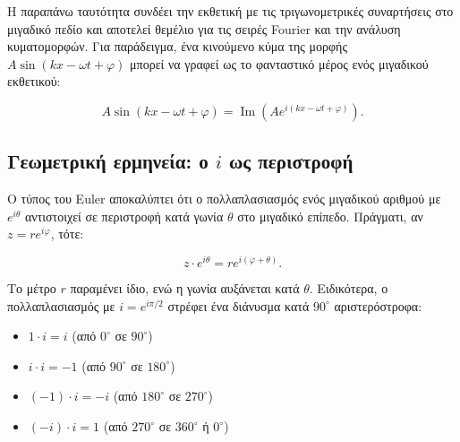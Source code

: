 Η παραπάνω ταυτότητα συνδέει την εκθετική με τις τριγωνομετρικές
συναρτήσεις στο μιγαδικό πεδίο και αποτελεί θεμέλιο για τις σειρές
Fourier και την ανάλυση κυματομορφών. Για παράδειγμα, ένα κινούμενο κύμα
της μορφής \(A\sin(kx - \omega t + \varphi)\) μπορεί να γραφεί ως το
φανταστικό μέρος ενός μιγαδικού εκθετικού:

\[
A\sin(kx - \omega t + \varphi) = \operatorname{Im}\left( A e^{i(kx - \omega t + \varphi)} \right).
\]

\subsection{\texorpdfstring{Γεωμετρική ερμηνεία: ο \(i\) ως
περιστροφή}{Γεωμετρική ερμηνεία: ο i ως περιστροφή}}\label{ux3b3ux3b5ux3c9ux3bcux3b5ux3c4ux3c1ux3b9ux3baux3ae-ux3b5ux3c1ux3bcux3b7ux3bdux3b5ux3afux3b1-ux3bf-i-ux3c9ux3c2-ux3c0ux3b5ux3c1ux3b9ux3c3ux3c4ux3c1ux3bfux3c6ux3ae}

Ο τύπος του Euler αποκαλύπτει ότι ο πολλαπλασιασμός ενός μιγαδικού
αριθμού με \(e^{i\theta}\) αντιστοιχεί σε περιστροφή κατά γωνία
\(\theta\) στο μιγαδικό επίπεδο. Πράγματι, αν \(z = r e^{i\varphi}\),
τότε:

\[
z \cdot e^{i\theta} = r e^{i(\varphi + \theta)}.
\]

Το μέτρο \(r\) παραμένει ίδιο, ενώ η γωνία αυξάνεται κατά \(\theta\).
Ειδικότερα, ο πολλαπλασιασμός με \(i = e^{i\pi/2}\) στρέφει ένα διάνυσμα
κατά \(90^\circ\) αριστερόστροφα:

\begin{itemize}
\tightlist
\item
  \(1 \cdot i = i\) (από \(0^\circ\) σε \(90^\circ\))
\item
  \(i \cdot i = -1\) (από \(90^\circ\) σε \(180^\circ\))
\item
  \((-1) \cdot i = -i\) (από \(180^\circ\) σε \(270^\circ\))
\item
  \((-i) \cdot i = 1\) (από \(270^\circ\) σε \(360^\circ\) ή
  \(0^\circ\))
\end{itemize}

